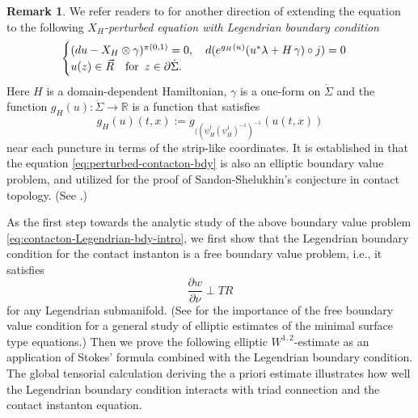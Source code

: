 \documentclass[reqno]{amsart}
\def\R{\ifmmode{\mathbb R}\else{$\mathbb R$}\fi} %
\newcommand{\del}{\partial}
\newcommand{\be}{\begin{equation}}
\newcommand{\ee}{\end{equation}}
\theoremstyle{theorem}
\theoremstyle{definition}
\newtheorem{rem}[thm]{Remark}
\numberwithin{equation}{section}
\def\R{{\mathbb R}}
\def\R{{\mathbb R}}
\def\R{\ifmmode{\mathbb R}\else{$\mathbb R$}\fi} %
\def\R{{\mathbb R}}
\def\R{{\mathbb R}}
\begin{document}
\begin{rem}
We refer readers to \cite{oh:entanglement1,oh:perturbed-contacton-bdy} for another direction of
extending the equation to the following \emph{$X_H$-perturbed equation
with Legendrian boundary condition}
\be\label{eq:perturbed-contacton-bdy}
\begin{cases}
(du - X_H \otimes \gamma)^{\pi(0,1)} = 0, \quad d(e^{g_H(u)}(u^*\lambda + H\, \gamma)\circ j) = 0\\
u(z) \in \vec R \quad \text{\rm for } \, z \in \del \dot \Sigma.
\end{cases}
\ee
Here $H$ is a domain-dependent Hamiltonian, $\gamma$ is a one-form on $\dot \Sigma$
and the function $g_H(u): \dot \Sigma \to \R$ is a function that satisfies
\be\label{eq:gHu}
g_H(u)(t,x) := g_{((\psi_H^t (\psi_H^1)^{-1})^{-1}}(u(t,x))
\ee
near each puncture in terms of the strip-like coordinates.
It is established in \cite{oh:perturbed-contacton-bdy} that the equation \eqref{eq:perturbed-contacton-bdy}
 is also an elliptic boundary value problem, and utilized for the proof of
Sandon-Shelukhin's conjecture in contact topology. (See \cite{oh:shelukhin-conjecture}.)
\end{rem}

As the first step towards the analytic study of the
above boundary value problem \eqref{eq:contacton-Legendrian-bdy-intro},
we first show that the Legendrian boundary condition for the contact instanton is a
free boundary value problem, i.e., it satisfies
$$
\frac{\del w}{\del \nu} \perp TR
$$
for any Legendrian submanifold. (See \cite{jost:free-bdy} for
the importance of the free boundary value condition for a general study of
elliptic estimates of the minimal surface type equations.) Then we
prove the following elliptic $W^{1,2}$-estimate as an application of
Stokes' formula combined with the Legendrian boundary condition. The global tensorial calculation deriving
the a priori estimate illustrates how well the Legendrian boundary condition interacts with
triad connection and the contact instanton equation.
\end{document}
